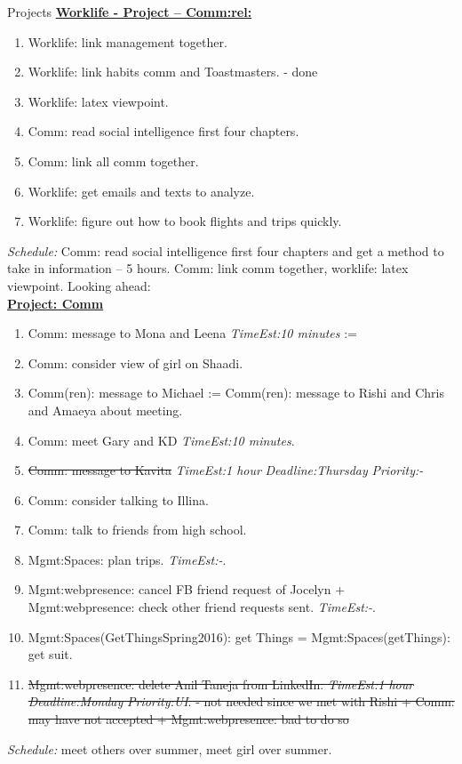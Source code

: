 \documentclass[serif, mathserif, final]{beamer}
\newcommand{\doneTask}[1]{\tiny \item \tiny \sout{#1}}
\newcommand{\te}[1]{\textit{TimeEst:}\textit{#1}}
\newcommand{\dl}[1]{\textit{Deadline:}\textit{#1}}
\newcommand{\pr}[1]{\textit{Priority:}\textit{#1}}
\begin{document}
\begin{frame}
\begin{columns}
\begin{column}{0.5\textwidth}
\begin{block}{Projects}
{\underline{\textbf{Worklife - Project – Comm:rel:}}}
\begin{enumerate} 
\tiny \item \tiny Worklife: link management together.  
\item \tiny Worklife: link habits comm and Toastmasters. - done
\item \tiny Worklife: latex viewpoint. 
\item \tiny Comm: read social intelligence first four chapters.
\item \tiny Comm: link all comm together.
\item \tiny Worklife: get emails and texts to analyze. 
\item \tiny Worklife: figure out how to book flights and trips quickly. 
\end{enumerate}
\textit{Schedule:} Comm: read social intelligence first four chapters
and get a method to take in information – 5 hours. Comm: link comm together, worklife: latex viewpoint. Looking ahead:  \\
{\underline{\textbf{ Project: Comm}}}
\begin{enumerate}
\tiny \item \tiny Comm: message to Mona and Leena \te{10 minutes}  := 
\item \tiny Comm: consider view of girl on Shaadi. 
\item \tiny Comm(ren): message to Michael :=  Comm(ren): message to Rishi and Chris and Amaeya about meeting. 
\item \tiny Comm: meet Gary and KD \te{10 minutes}. 
\doneTask{Comm: message to Kavita} 
\te{1 hour} \dl{Thursday} \pr{-}
      \item \tiny Comm: consider talking to Illina.
      \item \tiny Comm: talk to friends from high school.
      \item \tiny Mgmt:Spaces: plan trips. \te{-}.
      \item \tiny Mgmt:webpresence: cancel FB friend request of
        Jocelyn + Mgmt:webpresence: check other friend requests
        sent. \te{-}.
      \item \tiny Mgmt:Spaces(GetThingsSpring2016): get Things =
        Mgmt:Spaces(getThings): get suit. 
      \doneTask{Mgmt:webpresence: delete Anil Taneja from
        LinkedIn. \te{1 hour} \dl{Monday} \pr{UI}. - not needed since
        we met with Rishi  + Comm: may have not accepted +
        Mgmt:webpresence: bad to do so}
\end{enumerate}
{\it Schedule:} meet others over summer, meet girl over summer.\\
 

\end{block}
\end{column}
\end{columns}
\end{frame}
\end{document}
